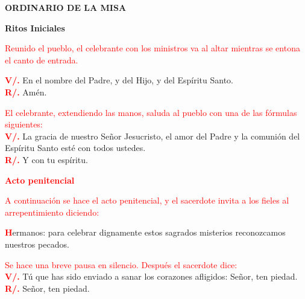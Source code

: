 \documentclass[12pt, letterpaper]{article}
\begin{document}

  \begin{center}
    \Huge {\bfseries ORDINARIO DE LA MISA}
  \end{center}

  \begin{center}
    \Huge {\bfseries Ritos Iniciales}
  \end{center}

  \large {\textcolor{red}{Reunido el pueblo, el celebrante con los ministros va al altar mientras se entona el canto de entrada.}}

  \noindent
  \Large {\bfseries \textcolor{red}{V/.}} \hspace{1cm} {En el nombre del Padre, y del Hijo, \Huge{\textcolor{red}{}} \Large y del Esp\'iritu Santo.}\\
  \noindent
  \Large{{\bfseries \textcolor{red}{R/.}} \hspace{1cm} Am\'en.}

  \large {\textcolor{red}{El celebrante, extendiendo las manos, saluda al pueblo con una de las f\'ormulas siguientes:}}\\
  \Large {\bfseries \textcolor{red}{V/.}} \hspace{1cm} La gracia de nuestro Se\~nor Jesucristo, el amor del Padre y la comuni\'on del Esp\'iritu Santo est\'e con todos ustedes.\\
  \noindent
  {\bfseries \textcolor{red}{R/.}} \hspace{1cm} \Large Y con tu esp\'iritu.

  \large {\bfseries \textcolor{red}{Acto penitencial}}

  \large {\textcolor{red}{A continuaci\'on se hace el acto penitencial, y el sacerdote invita a los fieles al arrepentimiento
  diciendo:}}

  \lettrine[lines=2]{\bfseries \textcolor{red}{H}}{}\Large {ermanos: para celebrar dignamente estos sagrados misterios reconozcamos nuestros pecados.}

  \large {\textcolor{red}{Se hace una breve pausa en silencio. Despu\'es el sacerdote dice:}}\\
  \Large {\bfseries \textcolor{red}{V/.}} \hspace{1cm} T\'u que has sido enviado a sanar los corazones afligidos: Se\~nor, ten piedad.\\
  \noindent
  \Large {\bfseries \textcolor{red}{R/.}} \hspace{1cm} Se\~nor, ten piedad. 
\end{document}
